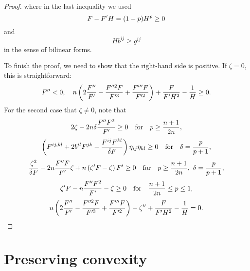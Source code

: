 \documentclass{amsart}
\begin{document}
\begin{proof}
where in the last inequality we used
$$F-F'H=(1-p)H^p\geq 0$$
and
$$Hb^{ij}\geq g^{ij}$$
in the sense of bilinear forms.

To finish the proof, we need to show that the right-hand side is positive. If $\zeta=0$, this is straightforward:
\[F''<0,\quad n\left(2\frac{F''}{F'}-\frac{F''^{2}F}{F'^{3}}+\frac{F'''F}{F'^{2}}\right)+\frac{F}{F'H^2}-\frac{1}{H}\geq 0.\]
For the second case that $\zeta\neq 0$, note that
$$2\zeta-2n\delta\frac{F''F^2}{F'}\geq 0\quad\mbox{for}\quad p\geq \frac{n+1}{2n},$$
$$\left(F^{ij,kl}+2b^{il}F^{jk}-\frac{F^{ij}F^{kl}}{\delta F}\right)\eta_{ij}\eta_{kl}\geq0\quad\mbox{for}\quad\delta=\frac{p}{p+1},$$
$$\frac{\zeta^2}{\delta F}-2n\frac{F''F}{F'}\zeta+n\left(\zeta'F-\zeta\right)F'\geq 0\quad\mbox{for}\quad p\geq\frac{n+1}{2n},~\delta=\frac{p}{p+1},$$
$$\zeta'F-n\frac{F''F^2}{F'}-\zeta\geq 0\quad\mbox{for}\quad\frac{n+1}{2n}\leq p\leq 1,$$
$$n\left(2\frac{F''}{F'}-\frac{F''^{2}F}{F'^{3}}+\frac{F'''F}{F'^{2}}\right)-\zeta''+\frac{F}{F'H^2}-\frac{1}{H}=0.$$
\end{proof}

\section{Preserving convexity}
\label{sec:convexity} 
\end{document}
